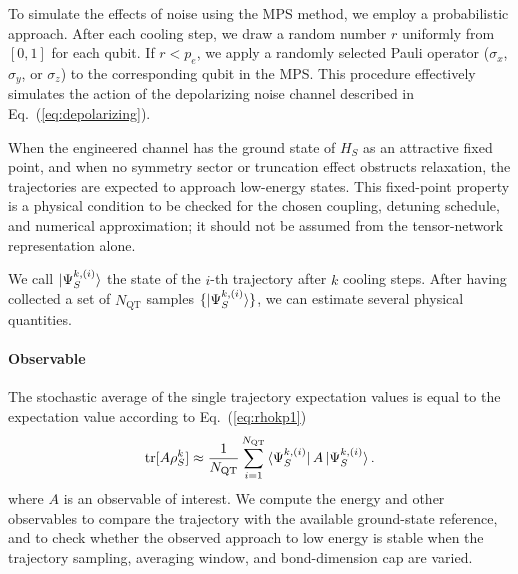 \documentclass[aps,pra,twocolumn,superscriptaddress,nolongbibliography,nobalancelastpage,10pt]{revtex4-2}
\begin{document}
To simulate the effects of noise using the MPS method, we employ a probabilistic approach. After each cooling step, we draw a random number $r$ uniformly from $[0,1]$ for each qubit. If $r < p_e$, we apply a randomly selected Pauli operator ($\sigma_x$, $\sigma_y$, or $\sigma_z$) to the corresponding qubit in the MPS. This procedure effectively simulates the action of the depolarizing noise channel described in Eq.~(\ref{eq:depolarizing}).

When the engineered channel has the ground state of $H_S$ as an attractive fixed point, and when no symmetry sector or truncation effect obstructs relaxation, the trajectories are expected to approach low-energy states. This fixed-point property is a physical condition to be checked for the chosen coupling, detuning schedule, and numerical approximation; it should not be assumed from the tensor-network representation alone.

We call $\ket{\Psi_S^{k,(i)}}$ the state of the $i$-th trajectory after $k$ cooling steps. After having collected a set of $N_\text{QT}$ samples $\{ \ket{\Psi_S^{k,(i)}} \}$, we can estimate several physical quantities.

\paragraph{Observable}
The stochastic average of the single trajectory expectation values is equal to the expectation value according to Eq.~(\ref{eq:rhokp1})
\begin{equation}
	\operatorname{tr}[A \rho_S^k] \approx \frac{1}{N_\text{QT}} \sum_{i=1}^{N_\text{QT}}\bra{\Psi_S^{k,(i)}}A\ket{\Psi_S^{k,(i)}}.
\end{equation}
where $A$ is an observable of interest.
We compute the energy and other observables to compare the trajectory with the
available ground-state reference, and to check whether the observed approach to
low energy is stable when the trajectory sampling, averaging window, and
bond-dimension cap are varied.
\end{document}
